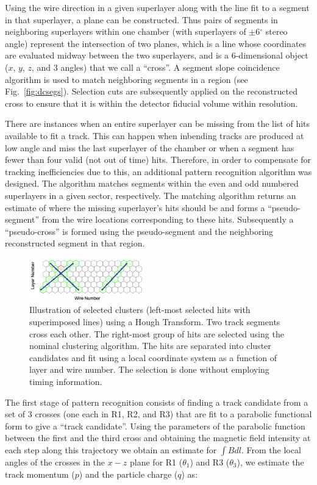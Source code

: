 Using the wire direction in a given superlayer along with the line fit to a segment in that superlayer, a plane can
be constructed. Thus pairs of segments in neighboring superlayers within one chamber (with superlayers of
$\pm$6$^\circ$ stereo angle) represent the intersection of two planes, which is a line whose coordinates are
evaluated midway between the two superlayers, and is a 6-dimensional object ($x$, $y$, $z$, and 3 angles) that
we call a ``cross''. A segment slope coincidence algorithm is used to match neighboring segments in a region (see
Fig.~\ref{fig:dcsegs}).  Selection cuts are subsequently applied on the reconstructed cross to ensure that it is
within the detector fiducial volume within resolution.

There are instances when an entire superlayer can be missing from the list of hits available to fit a track. 
This can happen when inbending tracks are produced at low angle and miss the last superlayer of the chamber or when a segment has fewer than four valid (not out of time) hits. Therefore, in order to compensate for tracking inefficiencies due to this, an additional pattern recognition algorithm was designed.  The algorithm matches segments within the even and odd numbered superlayers
in a given sector, respectively. The matching
algorithm returns an estimate of where the missing superlayer's hits should be and forms a ``pseudo-segment'' from
the wire locations corresponding to these hits. Subsequently a ``pseudo-cross'' is formed using the pseudo-segment
and the neighboring reconstructed segment in that region.

\begin{figure}
\includegraphics[width=0.45\textwidth]{pics/dcPattern14.png}
\caption{Illustration of selected clusters (left-most selected hits with superimposed lines) using a Hough Transform.
  Two track segments cross each other. The right-most group of hits are selected using the nominal clustering algorithm.  The hits are separated into cluster candidates and fit using a local coordinate
  system as a function of layer and wire number. The selection is done without employing timing information.}
\label{fig:hough}
\end{figure}

The first stage of pattern recognition consists of finding a track candidate from a set of 3 crosses (one each in R1,
R2, and R3) that are fit to a parabolic functional form to give a ``track candidate''. Using the parameters of the
parabolic function between the first and the third cross and obtaining the magnetic field intensity at each step along
this trajectory we obtain an estimate for $\int B dl$. From the local angles of the crosses in the $x-z$ plane for R1
($\theta_1$) and R3 ($\theta_3$), we estimate the track momentum ($p$) and the particle charge ($q$) as:

